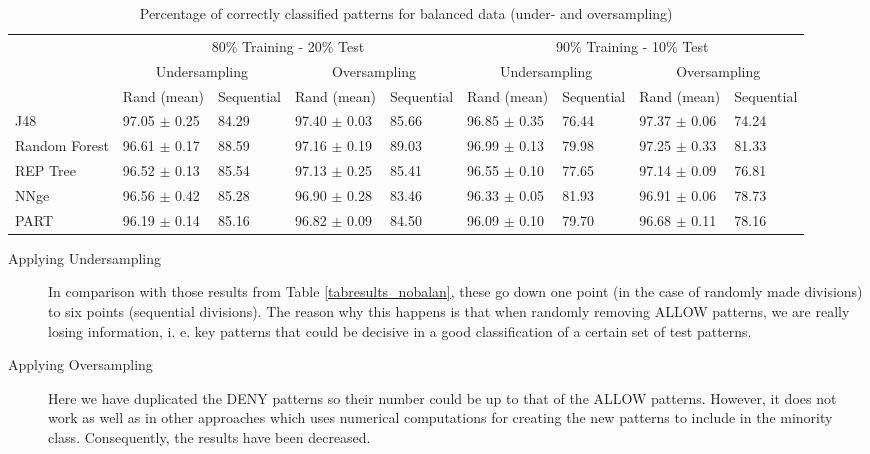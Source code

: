 \documentclass{llncs}
\begin{document}
\begin{table*}[htpb]
\centering
 \caption{\label{tabresults_balan} Percentage of correctly classified patterns for balanced data (under- and oversampling)}
{\small
\begin{tabular}{|l|l|l|l|l|l|l|l|l|}
\cline{2-9}
\multicolumn{1}{l|}{} & \multicolumn{4}{c|}{80\% Training - 20\% Test} & \multicolumn{4}{c|}{90\% Training - 10\% Test} \\ 
\cline{2-9}
\multicolumn{1}{l|}{} & \multicolumn{2}{c|}{Undersampling} & \multicolumn{2}{c|}{Oversampling} & \multicolumn{2}{c|}{Undersampling} & \multicolumn{2}{c|}{Oversampling} \\ 
\cline{2-9}
\multicolumn{1}{l|}{} & Rand (mean) & Sequential & Rand (mean) & Sequential & Rand (mean) & Sequential & Rand (mean) & Sequential \\ 
\hline
J48 & 97.05 $\pm$ 0.25 & 84.29 & 97.40 $\pm$ 0.03 & 85.66 & 96.85 $\pm$ 0.35 & 76.44 & 97.37 $\pm$ 0.06 & 74.24 \\ 
\cline{1-1}
Random Forest & 96.61 $\pm$ 0.17 & 88.59 & 97.16 $\pm$ 0.19 & 89.03 & 96.99 $\pm$ 0.13 & 79.98 & 97.25 $\pm$ 0.33 & 81.33 \\ 
\cline{1-1}
REP Tree & 96.52 $\pm$ 0.13 & 85.54 & 97.13 $\pm$ 0.25 & 85.41 & 96.55 $\pm$ 0.10 & 77.65 & 97.14 $\pm$ 0.09 & 76.81 \\ 
\cline{1-1}
NNge & 96.56 $\pm$ 0.42 & 85.28 & 96.90 $\pm$ 0.28 & 83.46 & 96.33 $\pm$ 0.05 & 81.93 & 96.91 $\pm$ 0.06 & 78.73 \\ 
\cline{1-1}
PART & 96.19 $\pm$ 0.14 & 85.16 & 96.82 $\pm$ 0.09 & 84.50 & 96.09 $\pm$ 0.10 & 79.70 & 96.68 $\pm$ 0.11 & 78.16 \\ 
\hline
\end{tabular}
}
\end{table*}

\begin{description}
  \item[Applying Undersampling] In comparison with those results from Table \ref{tabresults_nobalan}, these go down one point (in the case of randomly made divisions) to six points (sequential divisions). The reason why this happens is that when randomly removing ALLOW patterns, we are really losing information, i. e. key patterns that could be decisive in a good classification of a certain set of test patterns. 
  \item[Applying Oversampling] Here we have duplicated the DENY patterns so their number could be up to that of the ALLOW patterns. However, it does not work as well as in other approaches which uses numerical computations for creating the new patterns to include in the minority class. Consequently, the results have been decreased.
\end{description}
\end{document}
